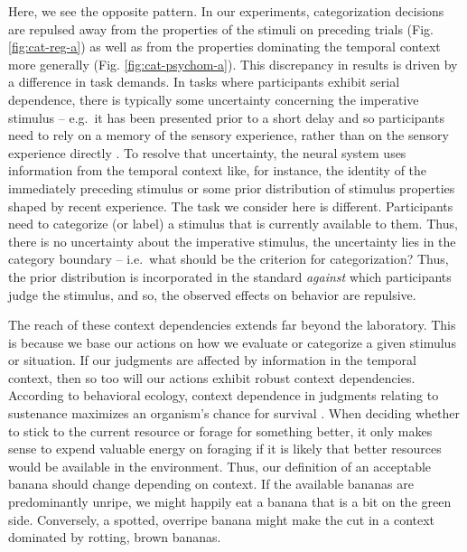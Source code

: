 \documentclass[a4paper, nobind]{templates/ociamthesis}
\begin{document}
Here, we see the opposite pattern. In our experiments, categorization decisions are repulsed away from the properties of the stimuli on preceding trials (Fig. \ref{fig:cat-reg-a}) as well as from the properties dominating the temporal context more generally (Fig. \ref{fig:cat-psychom-a}). This discrepancy in results is driven by a difference in task demands. In tasks where participants exhibit serial dependence, there is typically some uncertainty concerning the imperative stimulus -- e.g.~it has been presented prior to a short delay and so participants need to rely on a memory of the sensory experience, rather than on the sensory experience directly \autocite{hollingworth1910,kiyonaga2017}. To resolve that uncertainty, the neural system uses information from the temporal context like, for instance, the identity of the immediately preceding stimulus or some prior distribution of stimulus properties shaped by recent experience. The task we consider here is different. Participants need to categorize (or label) a stimulus that is currently available to them. Thus, there is no uncertainty about the imperative stimulus, the uncertainty lies in the category boundary -- i.e.~what should be the criterion for categorization? Thus, the prior distribution is incorporated in the standard \emph{against} which participants judge the stimulus, and so, the observed effects on behavior are repulsive.

The reach of these context dependencies extends far beyond the laboratory. This is because we base our actions on how we evaluate or categorize a given stimulus or situation. If our judgments are affected by information in the temporal context, then so too will our actions exhibit robust context dependencies. According to behavioral ecology, context dependence in judgments relating to sustenance maximizes an organism's chance for survival \autocite{stephens1986,kolling2012}. When deciding whether to stick to the current resource or forage for something better, it only makes sense to expend valuable energy on foraging if it is likely that better resources would be available in the environment. Thus, our definition of an acceptable banana should change depending on context. If the available bananas are predominantly unripe, we might happily eat a banana that is a bit on the green side. Conversely, a spotted, overripe banana might make the cut in a context dominated by rotting, brown bananas.
\end{document}
